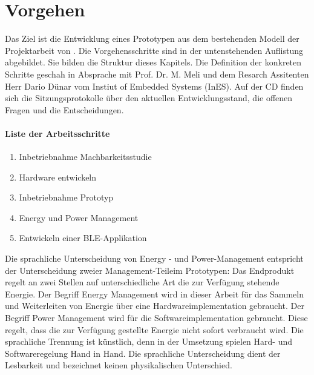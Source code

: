 \chapter{Vorgehen}
\label{ch_vorgehen} 

Das Ziel ist die Entwicklung eines Prototypen aus dem bestehenden Modell der Projektarbeit von \cite{PA_bicycle}. Die Vorgehensschritte sind in der untenstehenden Auflistung abgebildet. Sie bilden die Struktur dieses Kapitels. Die Definition der konkreten Schritte geschah in Absprache mit Prof. Dr. M. Meli und dem Resarch Assitenten Herr Dario Dünar vom Instiut of Embedded Systems (InES). Auf der CD finden sich die Sitzungsprotokolle über den aktuellen Entwicklungsstand, die offenen Fragen und die Entscheidungen.

\subsubsection*{Liste der Arbeitsschritte}
\label{liste} 

\begin{enumerate}
  \item Inbetriebnahme Machbarkeitsstudie  
  \item Hardware entwickeln  
  \item Inbetriebnahme Prototyp      
  \item Energy und Power Management
  \item Entwickeln einer BLE-Applikation       
 \end{enumerate}  

Die sprachliche Unterscheidung von Energy - und Power-Management entspricht der Unterscheidung zweier \glqq Management-Teile\grqq\medskip im Prototypen: Das Endprodukt regelt an zwei Stellen auf unterschiedliche Art die zur Verfügung stehende Energie. Der Begriff \glqq Energy Management \grqq wird in dieser Arbeit für das Sammeln und Weiterleiten von Energie über eine Hardwareimplementation gebraucht. Der Begriff \glqq Power Management \grqq wird für die Softwareimplementation gebraucht. Diese regelt, dass die zur Verfügung gestellte Energie nicht sofort verbraucht wird. Die sprachliche Trennung ist künstlich, denn in der Umsetzung spielen Hard- und Softwareregelung Hand in Hand. Die sprachliche Unterscheidung dient der Lesbarkeit und bezeichnet keinen physikalischen Unterschied.
 
 
  
